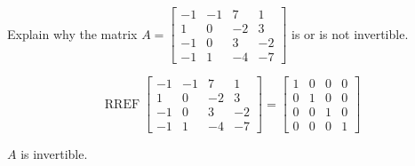 
\begin{exerciseStatement}


Explain why the matrix \(A= \left[\begin{array}{cccc}
-1 & -1 & 7 & 1 \\
1 & 0 & -2 & 3 \\
-1 & 0 & 3 & -2 \\
-1 & 1 & -4 & -7
\end{array}\right] \) is or is not invertible.


\end{exerciseStatement}
    
\begin{exerciseAnswer} 


\[\operatorname{RREF} \left[\begin{array}{cccc}
-1 & -1 & 7 & 1 \\
1 & 0 & -2 & 3 \\
-1 & 0 & 3 & -2 \\
-1 & 1 & -4 & -7
\end{array}\right] = \left[\begin{array}{cccc}
1 & 0 & 0 & 0 \\
0 & 1 & 0 & 0 \\
0 & 0 & 1 & 0 \\
0 & 0 & 0 & 1
\end{array}\right] \]

\(A\) is invertible.
\end{exerciseAnswer}
    
